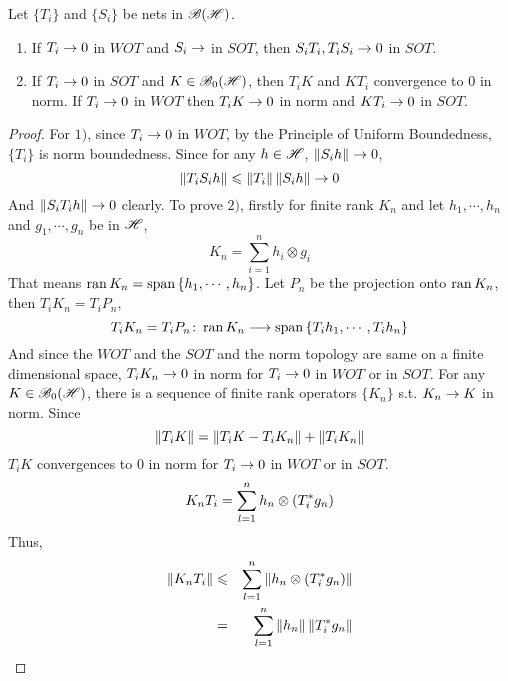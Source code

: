 \begin{prop}
	Let $\{T_i\}$ and $\{S_i\}$ be nets in $\mathscr{B(H)}$.
	\begin{enumerate}[label=\arabic*)]
		\item If $T_i \rightarrow 0$ in $WOT$ and $S_i \rightarrow$ in $SOT$, then $S_iT_i,T_iS_i \rightarrow 0$ in $SOT$.
		\item If $T_i \rightarrow 0$ in $SOT$ and $K \in \mathscr{B}_{0}\mathscr{(H)}$, then $T_iK$ and $KT_i$ convergence to $0$ in norm. If $T_i \rightarrow 0$ in $WOT$ then $T_iK \rightarrow 0$ in norm and $KT_i \rightarrow 0$ in $SOT$.
	\end{enumerate}
\end{prop}
\begin{proof}
	For $1)$, since $T_i \rightarrow 0$ in $WOT$, by the Principle of Uniform Boundedness, $\{T_i\}$ is norm boundedness. Since for any $h \in \mathscr{H}$, $\left\lVert S_i h\right\lVert \rightarrow 0$,
	\begin{equation*}
		\left\lVert T_iS_i h\right\lVert \leqslant \left\lVert T_i\right\lVert \left\lVert S_i h\right\lVert \rightarrow 0
	\end{equation*}
	And $\left\lVert S_iT_i h\right\lVert \rightarrow 0$ clearly.
	To prove $2)$, firstly for finite rank $K_n$ and let $h_1,\cdots,h_n$ and $g_1,\cdots,g_n$ be in $\mathscr{H}$,
	\begin{equation*}
		K_n = \sum_{i=1}^n h_i \otimes g_i
	\end{equation*}
	That means $\operatorname{ran}{K_n} = \operatorname{span}{\{h_1, \cdots, h_n\}}$. Let $P_n$ be the projection onto $\operatorname{ran}{K_n}$, then $T_iK_n = T_iP_n$, 
	\begin{equation*}
		T_iK_n = T_iP_n \colon \operatorname{ran}{K_n} \longrightarrow \operatorname{span}{\{T_ih_1, \cdots, T_ih_n\}}
	\end{equation*}
	And since the $WOT$ and the $SOT$ and the norm topology are same on a finite dimensional space, $T_iK_n \rightarrow 0$ in norm for $T_i \rightarrow 0$ in $WOT$ or in $SOT$. For any $K \in \mathscr{B}_{0}\mathscr{(H)}$, there is a sequence of finite rank operators $\{K_n\}$ s.t. $K_n \rightarrow K$ in norm. Since
	\begin{equation*}
		\left\lVert T_iK\right\lVert = \left\lVert T_iK - T_iK_n\right\lVert + \left\lVert T_iK_n\right\lVert
	\end{equation*}
	$T_iK$ convergences to $0$ in norm for $T_i \rightarrow 0$ in $WOT$ or in $SOT$.
	\begin{equation*}
		K_nT_i = \sum_{l=1}^{n} h_n \otimes (T_i^{*}g_n)
	\end{equation*}
	Thus,
	\begin{eqnarray*}
		\left\lVert K_nT_i\right\lVert &\leqslant& \sum_{l=1}^{n} \left\lVert h_n \otimes (T_i^{*}g_n)\right\lVert \\
		&=& \sum_{l=1}^n \left\lVert h_n\right\lVert\left\lVert T_i^{*} g_n\right\lVert
	\end{eqnarray*}

\end{proof}
